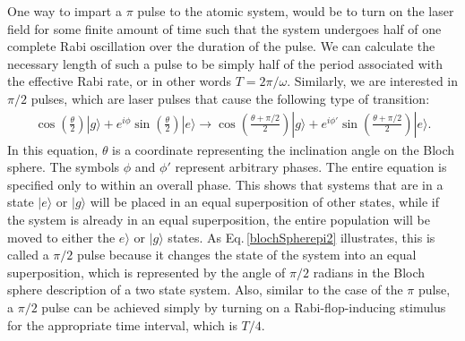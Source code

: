 One way to impart a $\pi$ pulse to the atomic system, would be to turn on the laser field for some finite amount of time such that the system undergoes half of one complete Rabi oscillation over the duration of the pulse. We can calculate the necessary length of such a pulse to be simply half of the period associated with the effective Rabi rate, or in other words $T = 2\pi/\omega$.
Similarly, we are interested in $\pi/2$ pulses, which are laser pulses that cause the following type of transition:
\begin{multline}
\cos\left(\frac{\theta}{2}\right)|g\rangle+
e^{i\phi}\sin\left(\frac{\theta}{2}\right)|e\rangle\rightarrow 
\cos\left(\frac{\theta+\pi/2}{2}\right)|g\rangle+
e^{i\phi'}\sin\left(\frac{\theta+\pi/2}{2}\right)|e\rangle.\label{blochSpherepi2}
\end{multline}
In this equation, $\theta$ is a coordinate representing the inclination angle on the Bloch sphere. The symbols $\phi$ and $\phi'$ represent arbitrary phases. The entire equation is specified only to within an overall phase. This shows that systems that are in a state $|e\rangle$ or $|g\rangle$ will be placed in an equal superposition of other states, while if the system is already in an equal superposition, the entire population will be moved to either the $e\rangle$ or $|g\rangle$ states.
As Eq.\,\eqref{blochSpherepi2} illustrates, this is called a $\pi/2$ pulse because it changes the state of the system into an equal superposition, which is represented by the angle of $\pi/2$ radians in the Bloch sphere description of a two state system. Also, similar to the case of the $\pi$ pulse, a $\pi/2$ pulse can be achieved simply by turning on a Rabi-flop-inducing stimulus for the appropriate time interval, which is $T/4$. 

